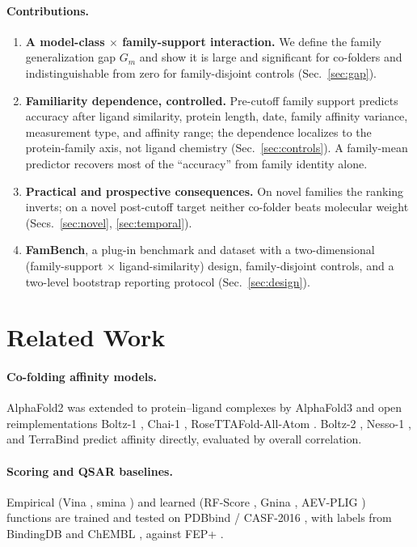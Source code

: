 \documentclass[11pt]{article}
\begin{document}
\paragraph{Contributions.}
\begin{enumerate}\itemsep2pt
  \item \textbf{A model-class $\times$ family-support interaction.} We define the family
  generalization gap $G_m$ and show it is large and significant for co-folders and
  indistinguishable from zero for family-disjoint controls (Sec.~\ref{sec:gap}).
  \item \textbf{Familiarity dependence, controlled.} Pre-cutoff family support predicts accuracy
  after ligand similarity, protein length, date, family affinity variance, measurement type, and
  affinity range; the dependence localizes to the protein-family axis, not ligand chemistry
  (Sec.~\ref{sec:controls}). A family-mean predictor recovers most of the ``accuracy'' from family
  identity alone.
  \item \textbf{Practical and prospective consequences.} On novel families the ranking inverts;
  on a novel post-cutoff target neither co-folder beats molecular weight (Secs.~\ref{sec:novel},
  \ref{sec:temporal}).
  \item \textbf{FamBench}, a plug-in benchmark and dataset with a two-dimensional
  (family-support $\times$ ligand-similarity) design, family-disjoint controls, and a two-level
  bootstrap reporting protocol (Sec.~\ref{sec:design}).
\end{enumerate}

\section{Related Work}

\paragraph{Co-folding affinity models.} AlphaFold2 \citep{jumper2021alphafold2} was extended to
protein--ligand complexes by AlphaFold3 \citep{abramson2024alphafold3} and open reimplementations
Boltz-1 \citep{wohlwend2024boltz1}, Chai-1 \citep{chai2024chai1}, RoseTTAFold-All-Atom
\citep{krishna2024rfaa}. Boltz-2 \citep{passaro2025boltz2}, Nesso-1 \citep{valencelabs2026nesso1},
and TerraBind \citep{terray2026terrabind} predict affinity directly, evaluated by overall
correlation.

\paragraph{Scoring and QSAR baselines.} Empirical (Vina \citep{trott2010vina}, smina
\citep{koes2013smina}) and learned (RF-Score \citep{ballester2010rfscore}, Gnina
\citep{mcnutt2021gnina}, AEV-PLIG \citep{valsson2025aevplig}) functions are trained and tested on
PDBbind \citep{liu2017pdbbind} / CASF-2016 \citep{su2019casf}, with labels from BindingDB
\citep{gilson2016bindingdb} and ChEMBL \citep{mendez2019chembl}, against FEP+
\citep{wang2015fep}.
\end{document}
